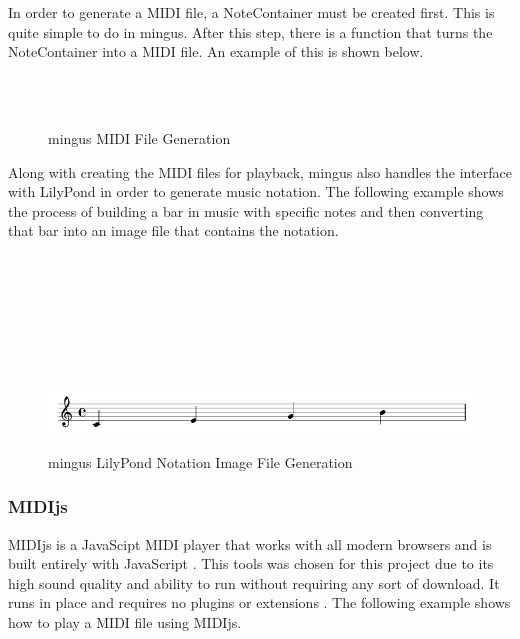 \vspace{\baselineskip}

In order to generate a MIDI file, a NoteContainer must be created first.  This is quite simple to do in mingus.  After this step, there is a function that turns the NoteContainer into a MIDI file.  An example of this is shown below.

\begin{figure}[!htbp]
	\caption{mingus MIDI File Generation \cite{Spaans_2015}}
	 \\
	 \\
\end{figure}

Along with creating the MIDI files for playback, mingus also handles the interface with LilyPond in order to generate music notation.  The following example shows the process of building a bar in music with specific notes and then converting that bar into an image file that contains the notation.

\begin{figure}[!htbp]
	\caption{mingus LilyPond Notation Image File Generation \cite{Spaans_2015}}
	 \\
	 \\
	 \\
	 \\
	 \\
	 \\
	 \\
	\includegraphics[scale=0.75]{images/mingusExample.png}
\end{figure}

\subsubsection{MIDIjs}
\label{subsubsec:midijs}

MIDIjs is a JavaScipt MIDI player that works with all modern browsers and is built entirely with JavaScript \cite{MIDIjs_ND}.  This tools was chosen for this project due to its high sound quality and ability to run without requiring any sort of download.  It runs in place and requires no plugins or extensions \cite{MIDIjs_ND}.  The following example shows how to play a MIDI file using MIDIjs.

